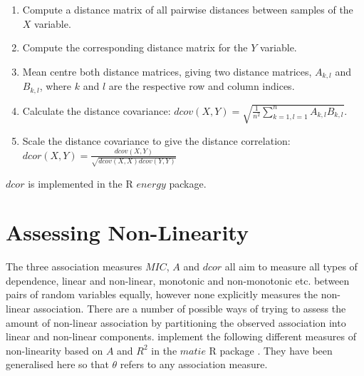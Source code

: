 \documentclass[a4paper, 12pt]{report}
\begin{document}
\begin{enumerate}
\item Compute a distance matrix of all pairwise distances between samples of the $X$ variable.
\item Compute the corresponding distance matrix for the $Y$ variable.
\item Mean centre both distance matrices, giving two distance matrices, $A_{k,l}$ and $B_{k,l}$, where $k$ and $l$ are the respective row and column indices.
\item Calculate the distance covariance: $dcov(X,Y) = \sqrt{\frac{1}{n^2} \sum^n_{k=1,l=1}A_{k,l}B_{k,l}}$.
\item Scale the distance covariance to give the distance correlation: \newline
$dcor(X,Y) = \frac{dcov(X,Y)}{\sqrt{dcov(X,X)dcov(Y,Y)}}$
\end{enumerate}

$dcor$ is implemented in the R $energy$ \cite{energy} package.  




\section{Assessing Non-Linearity}
The three association measures $MIC$, $A$ and $dcor$ all aim to measure all types of dependence, linear and non-linear, monotonic and non-monotonic etc. between pairs of random variables equally, however none explicitly measures the non-linear association. 
There are a number of possible ways of trying to assess the amount of non-linear association by partitioning the observed association into linear and non-linear components. \citet{Murrel:2013:Online} implement the following different measures of non-linearity based on $A$ and $R^2$ in the $matie$ R package \cite{matie}. They have been generalised here so that $\theta$ refers to any association measure.
\end{document}
